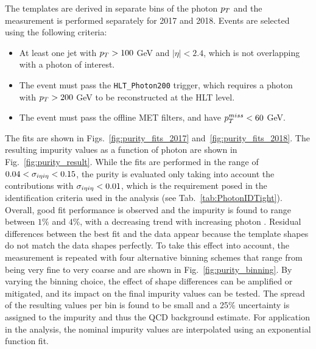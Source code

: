 The templates are derived in separate bins of the photon $p_T$ and the measurement is performed separately for 2017 and 2018. 
Events are selected using the following criteria:

\begin{itemize}
    \item At least one jet with $p_T>100$ GeV and $|\eta|<2.4$, which is not overlapping with a photon of interest.
    \item The event must pass the \texttt{HLT\_Photon200} trigger, which requires a photon with $p_T > 200$ GeV to be reconstructed at the HLT level.
    \item The event must pass the offline MET filters, and have $p_T^{miss} < 60$ GeV.
\end{itemize}

The fits are shown in Figs.~\ref{fig:purity_fits_2017} and~\ref{fig:purity_fits_2018}. The resulting impurity values as a function of photon \pt 
are shown in Fig.~\ref{fig:purity_result}. While the fits are performed in the range of $0.04<\sigma_{i\eta i\eta}<0.15$, the purity is evaluated only taking 
into account the contributions with $\sigma_{i\eta i\eta}<0.01$, which is the requirement posed in the identification criteria used in the analysis (see Tab.~\ref{tab:PhotonIDTight}).  
Overall, good fit performance is observed and the impurity is found to range between $1\%$ and $4\%$, with a decreasing trend with increasing photon \pt. 
Residual differences between the best fit and the data appear because the template shapes do not match the data shapes perfectly. To take this 
effect into account, the measurement is repeated with four alternative binning schemes that range from being very fine to very coarse and are shown in 
Fig.~\ref{fig:purity_binning}. By varying the binning choice, the effect of shape differences can be amplified or mitigated, and its impact on the 
final impurity values can be tested. The spread of the resulting values per bin is found to be small and a 25\% uncertainty is assigned to the impurity 
and thus the QCD background estimate. For application in the analysis, the nominal impurity values are interpolated using an exponential function fit.

